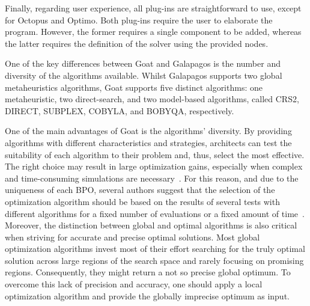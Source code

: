 	Finally, regarding user experience, all plug-ins are straightforward to use, except for Octopus and Optimo. Both plug-ins require the user to elaborate the program. However, the former requires a single component to be added, whereas the latter requires the definition of the solver using the provided nodes.
	
	One of the key differences between Goat and Galapagos is the number and diversity of the algorithms available. Whilst Galapagos supports two global metaheuristics algorithms, Goat supports five distinct algorithms: one metaheuristic, two direct-search, and two model-based algorithms, called CRS2, DIRECT, SUBPLEX, COBYLA, and BOBYQA, respectively. 
	
	One of the main advantages of Goat is the algorithms' diversity. By providing algorithms with different characteristics and strategies, architects can test the suitability of each algorithm to their problem and, thus, select the most effective. The right choice may result in large optimization gains, especially when complex and time-consuming simulations are necessary~\cite{Wortmann2016BBO}. For this reason, and due to the uniqueness of each \ac{BPO}, several authors suggest that the selection of the optimization algorithm should be based on the results of several tests with different algorithms for a fixed number of evaluations or a fixed amount of time~\cite{Hamdy2016,Wortmann2016BBO}. Moreover, the distinction between global and optimal algorithms is also critical when striving for accurate and precise optimal solutions. Most global optimization algorithms invest most of their effort searching for the truly optimal solution across large regions of the search space and rarely focusing on promising regions. Consequently, they might return a not so precise global optimum. To overcome this lack of precision and accuracy, one should apply a local optimization algorithm and provide the globally imprecise optimum as input.
	
	
	
